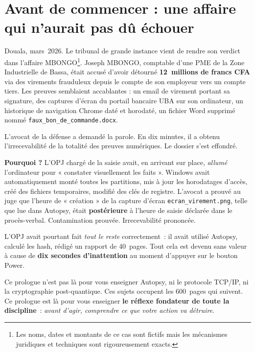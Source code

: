 \section*{Avant de commencer : une affaire qui n'aurait pas dû échouer}

Douala, mars~2026. Le tribunal de grande instance vient de rendre son verdict
dans l'affaire MBONGO\footnote{Les noms, dates et montants de ce cas sont
fictifs mais les mécanismes juridiques et techniques sont rigoureusement
exacts.}. Joseph MBONGO, comptable d'une PME de la Zone Industrielle de
Bassa, était accusé d'avoir détourné \textbf{12~millions de francs CFA} via
des virements frauduleux depuis le compte de son employeur vers un compte
tiers. Les preuves semblaient accablantes : un email de virement portant sa
signature, des captures d'écran du portail bancaire UBA sur son ordinateur,
un historique de navigation Chrome daté et horodaté, un fichier Word supprimé
nommé \texttt{faux\_bon\_de\_commande.docx}.

\medskip

L'avocat de la défense a demandé la parole. En dix minutes, il a obtenu
l'irrecevabilité de la totalité des preuves numériques. Le dossier s'est
effondré.

\begin{boxalert}
\textbf{Pourquoi ?} L'OPJ chargé de la saisie avait, en arrivant sur place,
\emph{allumé} l'ordinateur pour « constater visuellement les faits ». Windows
avait automatiquement monté toutes les partitions, mis à jour les horodatages
d'accès, créé des fichiers temporaires, modifié des clés de registre. L'avocat
a prouvé au juge que l'heure de « création » de la capture d'écran
\texttt{ecran\_virement.png}, telle que lue dans Autopsy, était
\textbf{postérieure} à l'heure de saisie déclarée dans le procès-verbal.
Contamination prouvée. Irrecevabilité prononcée.

L'OPJ avait pourtant fait \emph{tout le reste} correctement~: il avait utilisé
Autopsy, calculé les hash, rédigé un rapport de 40~pages. Tout cela est devenu
sans valeur à cause de \textbf{dix secondes d'inattention} au moment d'appuyer
sur le bouton Power.
\end{boxalert}

\medskip

Ce prologue n'est pas là pour vous enseigner Autopsy, ni le protocole TCP/IP,
ni la cryptographie post-quantique. Ces sujets occupent les 600~pages qui
suivent. Ce prologue est là pour vous enseigner \textbf{le réflexe fondateur
de toute la discipline}~: \emph{avant d'agir, comprendre ce que votre action
va détruire}.


